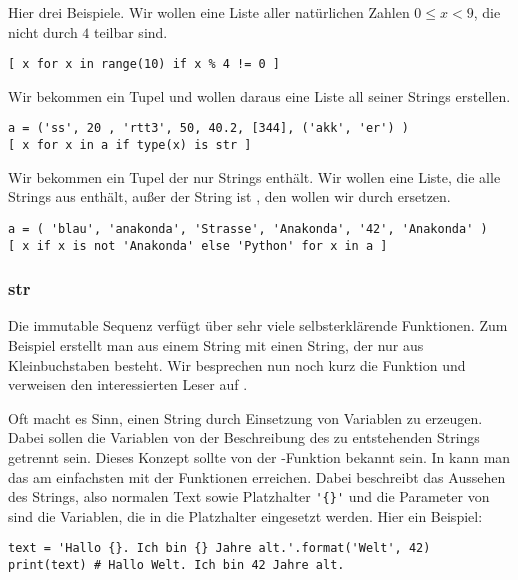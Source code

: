 Hier drei Beispiele.
Wir wollen eine Liste aller natürlichen Zahlen $0 \le x < 9$, die nicht durch $4$ teilbar sind.
\begin{lstlisting}
[ x for x in range(10) if x % 4 != 0 ]
\end{lstlisting}
Wir bekommen ein Tupel  und wollen daraus eine Liste all seiner Strings erstellen.
\begin{lstlisting}
a = ('ss', 20 , 'rtt3', 50, 40.2, [344], ('akk', 'er') )
[ x for x in a if type(x) is str ]
\end{lstlisting}
Wir bekommen ein Tupel  der nur Strings enthält.
Wir wollen eine Liste, die alle Strings aus  enthält, außer der String ist , den wollen wir durch  ersetzen.
\begin{lstlisting}
a = ( 'blau', 'anakonda', 'Strasse', 'Anakonda', '42', 'Anakonda' )
[ x if x is not 'Anakonda' else 'Python' for x in a ]
\end{lstlisting}


\subsubsection{str}
\label{section:std_data_types:sequenzen:str}
Die immutable Sequenz  verfügt über sehr viele selbsterklärende Funktionen.
Zum Beispiel erstellt man aus einem String  mit  einen String, der nur aus Kleinbuchstaben besteht. 
Wir besprechen nun noch kurz die Funktion  und verweisen den interessierten Leser auf \cite[Library, Build-in Types, Text Sequence Type]{Python3}.

Oft macht es Sinn, einen String durch Einsetzung von Variablen zu erzeugen.
Dabei sollen die Variablen von der Beschreibung des zu entstehenden Strings getrennt sein.
Dieses Konzept sollte von der \C-Funktion  bekannt sein.
In \Python kann man das am einfachsten mit der Funktionen  erreichen.
Dabei beschreibt  das Aussehen des Strings, also normalen Text sowie Platzhalter \lstinline[style=PyInline]|'{}'| und
die Parameter von  sind die Variablen, die in die Platzhalter eingesetzt werden.
Hier ein Beispiel:
\begin{lstlisting}
text = 'Hallo {}. Ich bin {} Jahre alt.'.format('Welt', 42)
print(text) # Hallo Welt. Ich bin 42 Jahre alt.
\end{lstlisting}

